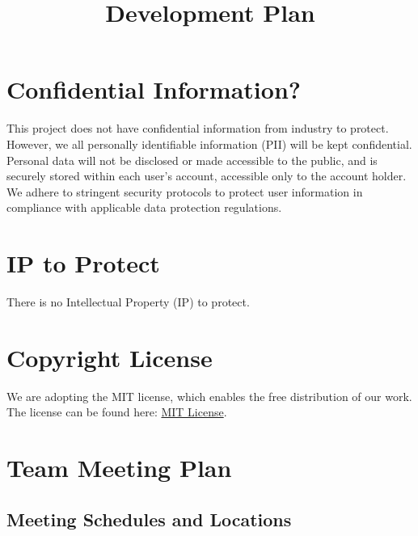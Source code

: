 \documentclass{article}
\title{Development Plan\\\progname}
\date{}
\begin{document}
\maketitle

\section{Confidential Information?}
This project does not have confidential information from industry to protect. However, we all personally identifiable information (PII) will be kept confidential. Personal data will not be disclosed or made accessible to the public, and is securely stored within each user's account, accessible only to the account holder. We adhere to stringent security protocols to protect user information in compliance with applicable data protection regulations.

\section{IP to Protect}
There is no Intellectual Property (IP) to protect.

\section{Copyright License}
We are adopting the MIT license, which enables the free distribution of our work. The license can be found here: \href{https://github.com/PlutosCapstone/Plutos/blob/main/LICENSE}{MIT License}.

\newpage

\section{Team Meeting Plan}

\subsection{Meeting Schedules and Locations}
\end{document}
